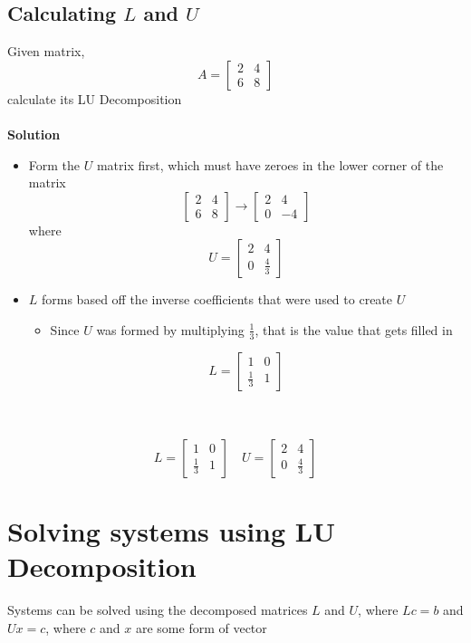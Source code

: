 \subsection{Calculating $L$ and $U$}
Given matrix,
\[
  A = \begin{bmatrix}
    2 & 4 \\
    6 & 8
  \end{bmatrix}
\]
calculate its LU Decomposition \\\\
\textbf{Solution}
\begin{itemize}
  \item Form the $U$ matrix first, which must have zeroes in the lower corner of the matrix
  \[
    \begin{bmatrix}  
      2 & 4 \\
      6 & 8
    \end{bmatrix} \rightarrow
    \begin{bmatrix}
      2 & 4 \\
      0 & -4
    \end{bmatrix}
  \] where
  \[
    U = \begin{bmatrix}
      2 & 4 \\
      0 & \frac{4}{3}
    \end{bmatrix}
  \]
\item $L$ forms based off the inverse coefficients that were used to create $U$ 
  \begin{itemize}
    \item Since $U$ was formed by multiplying $\frac{1}{3}$, that is the value that 
      gets filled in
  \end{itemize}
  \[
    L = \begin{bmatrix}
      1 & 0 \\
      \frac{1}{3} & 1
    \end{bmatrix}
  \]
\end{itemize} \\\\
\[
  L = \begin{bmatrix}
    1 & 0 \\
    \frac{1}{3} & 1
  \end{bmatrix} \quad U = \begin{bmatrix}
    2 & 4 \\
    0 & \frac{4}{3}
  \end{bmatrix}
\]
\section{Solving systems using LU Decomposition}
Systems can be solved using the decomposed matrices $L$ and $U$, where $Lc = b$ and $Ux = c$, 
where $c$ and $x$ are some form of vector
